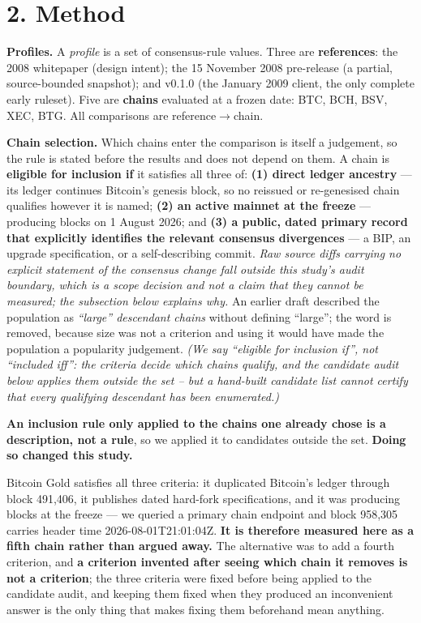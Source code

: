 \documentclass[
]{article}
\begin{document}
\section{2. Method}\label{method}

\textbf{Profiles.} A \emph{profile} is a set of consensus-rule values.
Three are \textbf{references}: the 2008 whitepaper \citep{nakamoto2008}
(design intent); the 15 November 2008 pre-release \citep{sni_code} (a
partial, source-bounded snapshot); and v0.1.0 \citep{sni_code} (the
January 2009 client, the only complete early ruleset). Five are
\textbf{chains} evaluated at a frozen date: BTC, BCH, BSV, XEC, BTG. All
comparisons are reference\(\rightarrow\)chain.

\textbf{Chain selection.} Which chains enter the comparison is itself a
judgement, so the rule is stated before the results and does not depend
on them. A chain is \textbf{eligible for inclusion if} it satisfies all
three of: \textbf{(1) direct ledger ancestry} --- its ledger continues
Bitcoin's genesis block, so no reissued or re-genesised chain qualifies
however it is named; \textbf{(2) an active mainnet at the freeze} ---
producing blocks on 1 August 2026; and \textbf{(3) a public, dated
primary record that explicitly identifies the relevant consensus
divergences} --- a BIP, an upgrade specification, or a self-describing
commit. \emph{Raw source diffs carrying no explicit statement of the
consensus change fall outside this study's audit boundary, which is a
scope decision and not a claim that they cannot be measured; the
subsection below explains why.} An earlier draft described the
population as \emph{``large'' descendant chains} without defining
``large''; the word is removed, because size was not a criterion and
using it would have made the population a popularity judgement.
\emph{(We say ``eligible for inclusion if'', not ``included iff'': the
criteria decide which chains qualify, and the candidate audit below
applies them outside the set -- but a hand-built candidate list cannot
certify that every qualifying descendant has been enumerated.)}

\textbf{An inclusion rule only applied to the chains one already chose
is a description, not a rule}, so we applied it to candidates outside
the set. \textbf{Doing so changed this study.}

Bitcoin Gold satisfies all three criteria: it duplicated Bitcoin's
ledger through block 491,406, it publishes dated hard-fork
specifications, and it was producing blocks at the freeze --- we queried
a primary chain endpoint and block 958,305 carries header time
2026-08-01T21:01:04Z. \textbf{It is therefore measured here as a fifth
chain rather than argued away.} The alternative was to add a fourth
criterion, and \textbf{a criterion invented after seeing which chain it
removes is not a criterion}; the three criteria were fixed before being
applied to the candidate audit, and keeping them fixed when they
produced an inconvenient answer is the only thing that makes fixing them
beforehand mean anything.
\end{document}
